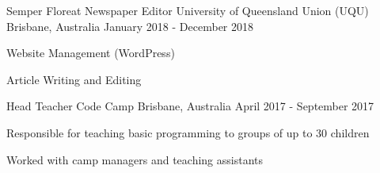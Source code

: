 \begin{cventries}

\cventry
{Semper Floreat Newspaper Editor} %
{University of Queensland Union (UQU)} %
{Brisbane, Australia} %
{January 2018 - December 2018} %
{ %
\begin{cvitems}
\item {Website Management (WordPress)}
\item {Article Writing and Editing}
\end{cvitems}
}


\cventry
{Head Teacher} %
{Code Camp} %
{Brisbane, Australia} %
{April 2017 - September 2017} %
{ %
\begin{cvitems}
\item {Responsible for teaching basic programming to groups of up to 30 children}
\item {Worked with camp managers and teaching assistants}
\end{cvitems}
}


\end{cventries}
